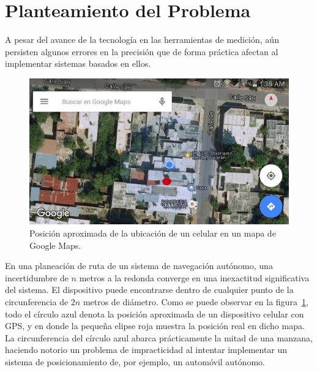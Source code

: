 \section{Planteamiento del Problema}
A pesar del avance de la tecnología en las herramientas de medición, aún persisten algunos errores en la precisión que de forma práctica afectan al implementar sistemas basados en ellos. \\

\begin{figure}[H]
\centering
\includegraphics[scale=0.2]{Figures/Pred}
\caption[Posición de celular en mapa.]{Posición aproximada de la ubicación de un celular en un mapa de Google Maps.}
\label{fig:Prec}
\end{figure}

En una planeación de ruta de un sistema de navegación autónomo, una incertidumbre de $n$ metros a la redonda converge en una inexactitud significativa del sistema. El dispositivo puede encontrarse dentro de cualquier punto de la circunferencia de $2n$ metros de diámetro. Como se puede observar en la figura~\ref{fig:Prec}, todo el círculo azul denota la posición aproximada de un dispositivo celular con GPS, y en donde la pequeña elipse roja muestra la posición real en dicho mapa. La circunferencia del círculo azul abarca prácticamente la mitad de una manzana, haciendo notorio un problema de impracticidad al intentar implementar un sistema de posicionamiento de, por ejemplo, un automóvil autónomo.

